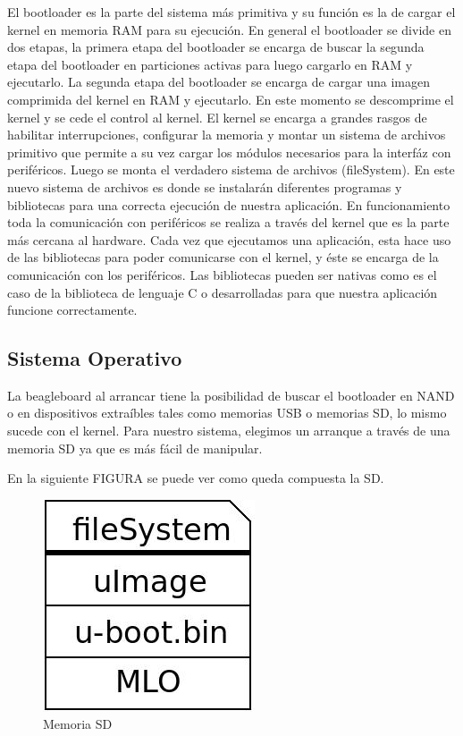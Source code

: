 El bootloader es la parte del sistema más primitiva y su función es la de cargar el kernel en memoria RAM para su ejecución. En general el bootloader se divide en dos etapas, la primera etapa del bootloader se encarga de buscar la segunda etapa del bootloader en particiones activas para luego cargarlo en RAM y ejecutarlo. La segunda etapa del bootloader se encarga de cargar una imagen comprimida del kernel en RAM y ejecutarlo. En este momento se descomprime el kernel y se cede el control al kernel.
El kernel se encarga a grandes rasgos de habilitar interrupciones, configurar la memoria y montar un sistema de archivos primitivo que permite a su vez cargar los módulos necesarios para la interfáz con periféricos. Luego se monta el verdadero sistema de archivos (fileSystem). En este nuevo sistema de archivos es donde se instalarán diferentes programas y bibliotecas para una correcta ejecución de nuestra aplicación.
En funcionamiento toda la comunicación con periféricos se realiza a través del kernel que es la parte más cercana al hardware.
Cada vez que ejecutamos una aplicación, esta hace uso de las bibliotecas para poder comunicarse con el kernel, y éste se encarga de la comunicación con los periféricos. Las bibliotecas pueden ser nativas como es el caso de la biblioteca de lenguaje C o desarrolladas para que nuestra aplicación funcione correctamente.


\subsection{Sistema Operativo}
La beagleboard al arrancar tiene la posibilidad de buscar el bootloader en NAND o en dispositivos extraíbles tales como memorias USB o memorias SD, lo mismo sucede con el kernel. Para nuestro sistema, elegimos un arranque a través de una memoria SD ya que es más fácil de manipular.

En la siguiente FIGURA se puede ver como queda compuesta la SD.

\begin{figure}[H]
\centering
  \begin{center}
  \includegraphics[scale=.4]{Imagenes/sd.jpg} 
  \end{center}
  \caption{Memoria SD}\label{Fig:HW} 
\end{figure}

